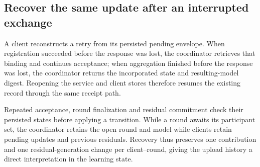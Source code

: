 \subsection{Recover the same update after an interrupted exchange}
A client reconstructs a retry from its persisted pending envelope. When registration succeeded before the response was lost, the coordinator retrieves that binding and continues acceptance; when aggregation finished before the response was lost, the coordinator returns the incorporated state and resulting-model digest. Reopening the service and client stores therefore resumes the existing record through the same receipt path.

Repeated acceptance, round finalization and residual commitment check their persisted states before applying a transition. While a round awaits its participant set, the coordinator retains the open round and model while clients retain pending updates and previous residuals. Recovery thus preserves one contribution and one residual-generation change per client--round, giving the upload history a direct interpretation in the learning state.
